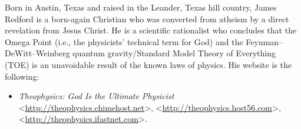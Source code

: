 \documentclass[letterpaper,12pt]{article}
\begin{document}
Born in Austin, Texas and raised in the Leander, Texas hill country, James Redford is a born-again Christian who was converted from atheism by a direct revelation from Jesus Christ. He is a scientific rationalist who concludes that the Omega Point (i.e., the physicists' technical term for God) and the Feynman--DeWitt--Weinberg quantum gravity\slash Standard Model Theory of Everything (TOE) is an unavoidable result of the known laws of physics. His website is the following:

\begin{itemize}
\small
\item \emph{Theophysics: God Is the Ultimate Physicist} \textless\url{http://theophysics.chimehost.net}\textgreater  , \textless\url{http://theophysics.host56.com}\textgreater , \textless\url{http://theophysics.ifastnet.com}\textgreater .
\end{itemize}
\end{document}

